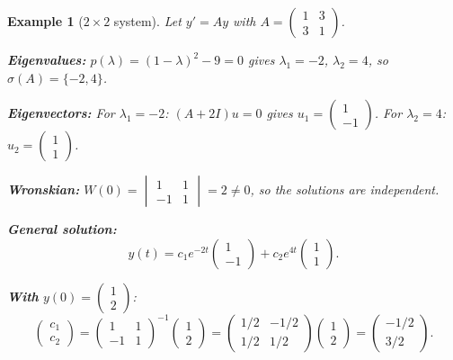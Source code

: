 \documentclass{article}
\newtheorem*{example}{Example}
\begin{document}
\begin{example}[$2\times 2$ system]
    Let $y' = Ay$ with $A = \begin{pmatrix}1&3\\3&1\end{pmatrix}$.

    \textbf{Eigenvalues:} $p(\lambda) = (1-\lambda)^2 - 9 = 0$ gives 
    $\lambda_1 = -2$, $\lambda_2 = 4$, so $\sigma(A) = \{-2, 4\}$.

    \textbf{Eigenvectors:} For $\lambda_1 = -2$: $(A+2I)u = 0$ gives 
    $u_1 = \begin{pmatrix}1\\-1\end{pmatrix}$. For $\lambda_2 = 4$: 
    $u_2 = \begin{pmatrix}1\\1\end{pmatrix}$.

    \textbf{Wronskian:} $W(0) = \begin{vmatrix}1&1\\-1&1
    \end{vmatrix} = 2 \neq 0$, so the solutions are independent.

    \textbf{General solution:}
    \[y(t) = c_1 e^{-2t}\begin{pmatrix}1\\-1\end{pmatrix} + 
    c_2 e^{4t}\begin{pmatrix}1\\1\end{pmatrix}.\]

    \textbf{With} $y(0) = \begin{pmatrix}1\\2\end{pmatrix}$:
    \[\begin{pmatrix}c_1\\c_2\end{pmatrix} = 
    \begin{pmatrix}1&1\\-1&1\end{pmatrix}^{-1}
    \begin{pmatrix}1\\2\end{pmatrix} = 
    \begin{pmatrix}1/2 & -1/2\\1/2&1/2\end{pmatrix}
    \begin{pmatrix}1\\2\end{pmatrix} = 
    \begin{pmatrix}-1/2\\3/2\end{pmatrix}.\]
\end{example}
\end{document}
